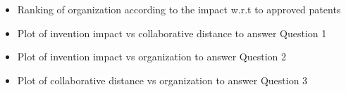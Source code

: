 	\begin{itemize}
	\squish
		\item Ranking of organization according to the impact w.r.t to approved patents
		\item Plot of invention impact vs collaborative distance to answer Question 1
		\item Plot of invention impact vs organization to answer Question 2
		\item Plot of collaborative distance vs organization to answer Question 3
	\end{itemize}
